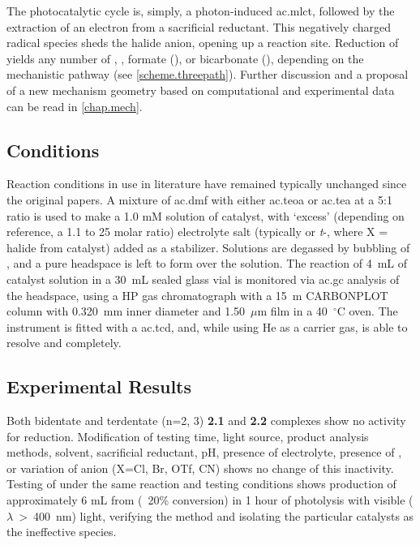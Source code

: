 The photocatalytic cycle is, simply, a photon-induced \gls{ac.mlct}, followed by the extraction of an electron from a sacrificial reductant. This negatively charged radical species sheds the halide anion, opening up a reaction site. Reduction of  yields any number of , , formate (), or bicarbonate (), depending on the mechanistic pathway (see \autoref{scheme.threepath}). Further discussion and a proposal of a new mechanism geometry based on computational and experimental data can be read in \autoref{chap.mech}.

\subsection{Conditions}

Reaction conditions in use in literature have remained typically unchanged since the original papers. A mixture of \gls{ac.dmf} with either \gls{ac.teoa} or \gls{ac.tea} at a 5:1 ratio is used to make a 1.0 mM solution of catalyst, with `excess' (depending on reference, a 1.1 to 25 molar ratio) electrolyte salt (typically  or \textit{t}-, where X = halide from catalyst) added as a stabilizer. Solutions are degassed by bubbling of , and a pure  headspace is left to form over the solution. The reaction of 4~mL of catalyst solution in a 30~mL sealed glass vial is monitored via \gls{ac.gc} analysis of the headspace, using a HP gas chromatograph with a 15~m CARBONPLOT column with 0.320~mm inner diameter and 1.50~$\mu$m film in a 40~$^\circ$C oven. The instrument is fitted with a \gls{ac.tcd}, and, while using He as a carrier gas, is able to resolve  and  completely.  

\subsection{Experimental Results}

Both bidentate and terdentate  (n=2, 3) \textbf{2.1} and \textbf{2.2} complexes show no activity for  reduction. Modification of testing time, light source, product analysis methods, solvent, sacrificial reductant, pH, presence of electrolyte, presence of , or variation of anion (X=Cl, Br, OTf, CN) shows no change of this inactivity. Testing of  under the same reaction and testing conditions shows production of approximately 6 mL  from  (~20\% conversion) in 1 hour of photolysis with visible ($\lambda$~\textgreater ~400~nm) light, verifying the method and isolating the particular catalysts as the ineffective species. 

